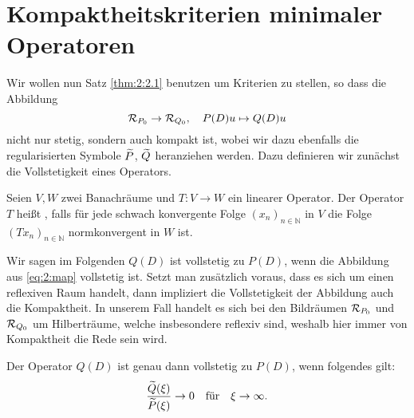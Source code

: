 \section{Kompaktheitskriterien minimaler Operatoren}
Wir wollen nun Satz \ref{thm:2:2.1} benutzen um Kriterien zu stellen, so dass die Abbildung
\begin{equation}\label{eq:2:map}
\mathcal R_{P_0}\to\mathcal R_{Q_0},\quad P(D)u\mapsto Q(D)u
\end{equation}
nicht nur stetig, sondern auch kompakt ist, wobei wir dazu ebenfalls die regularisierten Symbole $\widetilde{P}$, $\widetilde{Q}$ heranziehen werden. Dazu definieren wir zunächst die Vollstetigkeit eines Operators.
\begin{df}
Seien $V,W$ zwei Banachräume und $T: V \rightarrow W$ ein linearer Operator. Der Operator $T$ heißt , falls für jede schwach konvergente Folge $(x_n)_{n \in \mathbb{N}}$ in $V$ die Folge $(Tx_n)_{n \in \mathbb{N}}$ normkonvergent in $W$ ist.
\end{df}
Wir sagen im Folgenden $Q(D)$ ist vollstetig zu $P(D)$, wenn die Abbildung aus \eqref{eq:2:map} vollstetig ist. Setzt man zusätzlich voraus, dass es sich um einen reflexiven Raum handelt, dann impliziert die Vollstetigkeit der Abbildung auch die Kompaktheit. In unserem Fall handelt es sich bei den Bildräumen $\mathcal R_{P_0}$ und $\mathcal R_{Q_0}$ um Hilberträume, welche insbesondere reflexiv sind, weshalb hier immer von Kompaktheit die Rede sein wird.
\begin{thm}\label{Abbildung kompakt}
Der Operator $Q(D)$ ist genau dann vollstetig zu $P(D)$,
wenn folgendes gilt:
\begin{equation}\label{eq:2:tozero}
\frac{\widetilde{Q}(\xi)}{\widetilde{P}(\xi)}\to0 \quad\text{für}\quad\xi\to\infty.
\end{equation}
\end{thm}
